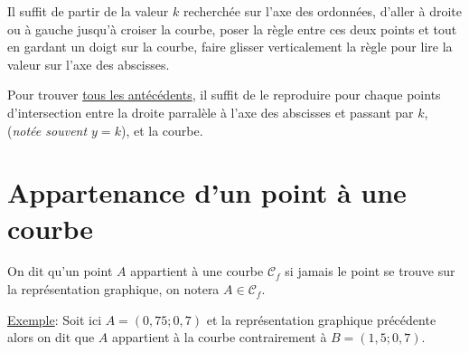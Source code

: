 \documentclass[french]{book}
\begin{document}

Il suffit de partir de la valeur $k$ recherchée sur l'axe des ordonnées, d'aller à droite ou à gauche jusqu'à croiser la courbe, poser la règle entre ces deux points et tout en gardant un doigt sur la courbe, faire glisser verticalement la règle pour lire la valeur sur l'axe des abscisses.

Pour trouver \underline{tous les antécédents}, il suffit de le reproduire pour chaque points d'intersection entre la droite parralèle à l'axe des abscisses et passant par $k$, (\emph{notée souvent $y=k$}), et la courbe.



\section{Appartenance d'un point à une courbe}

On dit qu'un point $A$ appartient à une courbe $\mathcal{C}_f$ si jamais le point se trouve sur la représentation graphique, on notera $A \in \mathcal{C}_f$.

\underline{Exemple}: Soit ici $A=(0,75;0,7)$ et la représentation graphique précédente alors on dit que $A$ appartient à la courbe contrairement à $B=(1,5;0,7)$.

\begin{center}
\end{center}
\end{document}
